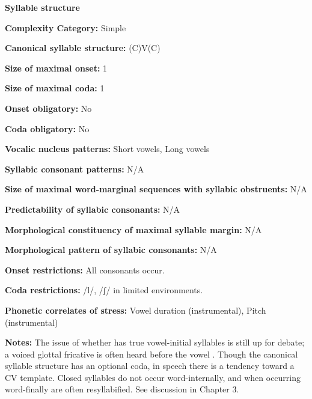 \textbf{Syllable structure}



\textbf{Complexity Category:} Simple



\textbf{Canonical syllable structure:} (C)V(C) \citep[21-22]{Yumitani1998}



\textbf{Size of maximal onset:} 1



\textbf{Size of maximal coda:} 1



\textbf{Onset obligatory:} No



\textbf{Coda obligatory:} No



\textbf{Vocalic nucleus patterns:} Short vowels, Long vowels



\textbf{Syllabic consonant patterns:} N/A



\textbf{Size of maximal word{}-marginal sequences with syllabic obstruents:} N/A



\textbf{Predictability of syllabic consonants:} N/A



\textbf{Morphological constituency of maximal syllable margin:} N/A



\textbf{Morphological pattern of syllabic consonants:} N/A



\textbf{Onset restrictions:} All consonants occur.



\textbf{Coda restrictions:} /l/, /ʃ/ in limited environments.



\textbf{Phonetic correlates of stress:} Vowel duration (instrumental), Pitch (instrumental)



\textbf{Notes:} The issue of whether  has true vowel-initial syllables is still up for debate; a voiced glottal fricative is often heard before the vowel \citep[22-23]{Yumitani1998}. Though the canonical syllable structure has an optional coda, in speech there is a tendency toward a CV template. Closed syllables do not occur word-internally, and when occurring word-finally are often resyllabified. See discussion in Chapter 3.



